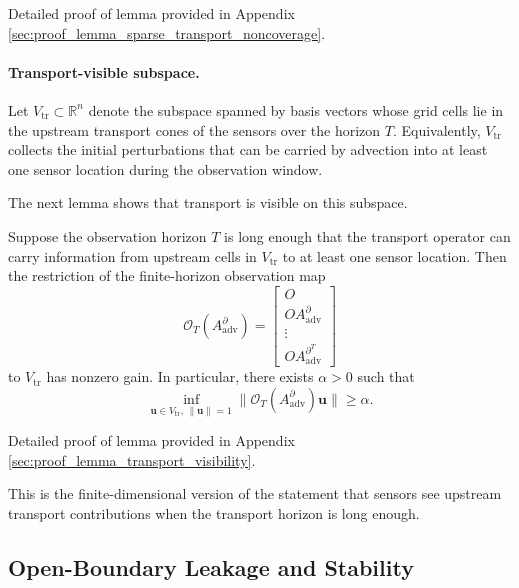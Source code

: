 Detailed proof of lemma provided in Appendix \ref{sec:proof_lemma_sparse_transport_noncoverage}.


\paragraph{Transport-visible subspace.}
Let $V_{\mathrm{tr}}\subset\mathbb{R}^n$ denote the subspace spanned by basis vectors whose grid cells lie in the upstream transport cones of the sensors over the horizon $T$. Equivalently, $V_{\mathrm{tr}}$ collects the initial perturbations that can be carried by advection into at least one sensor location during the observation window.

The next lemma shows that transport is visible on this subspace.

\begin{lemma}
\label{lem:transport_visibility}
Suppose the observation horizon $T$ is long enough that the transport operator can carry information from upstream cells in $V_{\mathrm{tr}}$ to at least one sensor location. Then the restriction of the finite-horizon observation map
\begin{equation}
\mathcal{O}_T(A_{\mathrm{adv}}^{\partial})
=
\begin{bmatrix}
O\\
OA_{\mathrm{adv}}^{\partial}\\
\vdots\\
OA_{\mathrm{adv}}^{{\partial}^T}
\end{bmatrix} \nonumber
\end{equation}
to $V_{\mathrm{tr}}$ has nonzero gain. In particular, there exists $\alpha>0$ such that
\begin{equation}
\inf_{\mathbf{u}\in V_{\mathrm{tr}},\,\|\mathbf{u}\|=1}
\|\mathcal{O}_T(A_{\mathrm{adv}}^{\partial})\mathbf{u}\|
\ge \alpha. 
\label{eq:transport_visibility_derived}
\end{equation}
\end{lemma}
Detailed proof of lemma provided in Appendix \ref{sec:proof_lemma_transport_visibility}.

This is the finite-dimensional version of the statement that sensors see upstream transport contributions when the transport horizon is long enough.

\subsection{Open-Boundary Leakage and Stability}
\label{subsec:open_boundary_stability}

